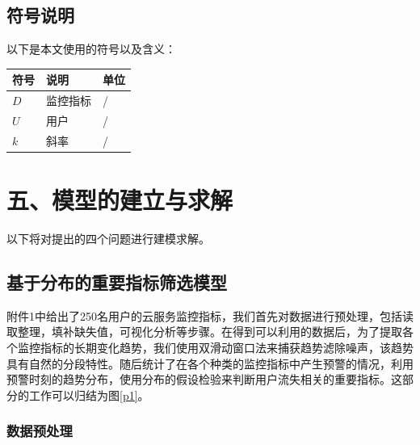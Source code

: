 \documentclass{my_paper}
\begin{document}
\subsection{符号说明}
以下是本文使用的符号以及含义：
\begin{table}[h]%
    \centering
    \begin{tabular}{p{2.0cm}<{\centering}p{9.0cm}<{\centering}p{2.0cm}<{\centering}}
    \hline
    符号 & 说明 & 单位 \\ %
    \hline
    $D$ & 监控指标 & /\\
    $U$ & 用户    & / \\
    $k$ & 斜率   & /\\
    
    \hline
    \end{tabular}
\end{table}

\section{五、模型的建立与求解}

以下将对提出的四个问题进行建模求解。

\subsection{基于分布的重要指标筛选模型}

附件1中给出了250名用户的云服务监控指标，我们首先对数据进行预处理，包括读取整理，填补缺失值，可视化分析等步骤。在得到可以利用的数据后，为了提取各个监控指标的长期变化趋势，我们使用双滑动窗口法\cite{2}来捕获趋势滤除噪声，该趋势具有自然的分段特性。随后统计了在各个种类的监控指标中产生预警的情况，利用预警时刻的趋势分布，使用分布的假设检验来判断用户流失相关的重要指标。这部分的工作可以归结为图\ref{p1}。

\subsubsection{数据预处理}
\end{document}
